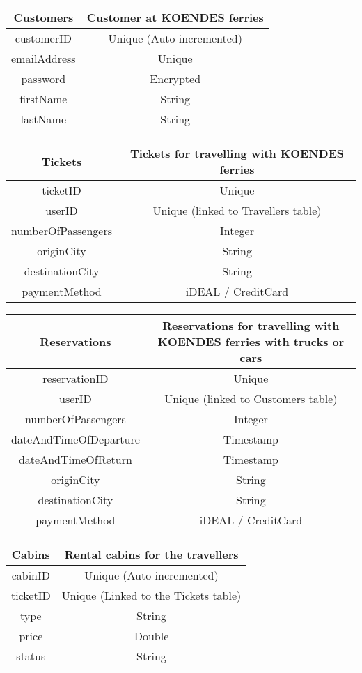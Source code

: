 \begin{table}[H]
\begin{tabular}{|c|c}
\cline{1-1}
Customers & Customer at KOENDES ferries \\ \hline
customerID & Unique (Auto incremented) \\ emailAddress & Unique \\ password & Encrypted \\ firstName & String \\ lastName & String \\ \hline
\end{tabular}
\end{table}

\begin{table}[H]
\begin{tabular}{|c|c}
\cline{1-1}
Tickets & Tickets for travelling with KOENDES ferries \\ \hline
ticketID & Unique \\ userID &  Unique (linked to Travellers table)  \\ numberOfPassengers & Integer \\ originCity & String \\ destinationCity & String \\ paymentMethod & iDEAL / CreditCard \\\hline
\end{tabular}
\end{table}

\begin{table}[H]
\begin{tabular}{|c|c}
\cline{1-1}
Reservations & Reservations for travelling with KOENDES ferries with trucks or cars \\ \hline
reservationID & Unique \\ userID & Unique (linked to Customers table) \\ numberOfPassengers & Integer \\ dateAndTimeOfDeparture & Timestamp \\ dateAndTimeOfReturn & Timestamp \\ originCity & String \\ destinationCity & String \\ paymentMethod & iDEAL / CreditCard \\\hline
\end{tabular}
\end{table}

\begin{table}[H]
\begin{tabular}{|c|c}
\cline{1-1}
Cabins & Rental cabins for the travellers \\ \hline
cabinID & Unique (Auto incremented) \\ ticketID & Unique (Linked to the Tickets table) \\ type & String \\ price & Double \\ status & String \\\hline
\end{tabular}
\end{table}

